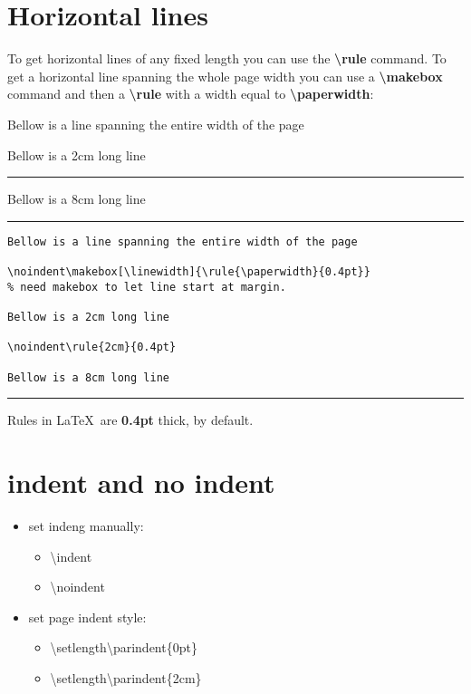 \section{Horizontal lines}
To get horizontal lines of any fixed length you can use the \textbf{\textbackslash rule} command. To get a horizontal line spanning the whole page width you can use a \textbf{\textbackslash makebox} command and then a \textbf{\textbackslash rule} with a width equal to \textbf{\textbackslash paperwidth}:

Bellow is a line spanning the entire width of the page

\noindent\makebox[\linewidth]{\rule{\paperwidth}{0.4pt}} 

Bellow is a 2cm long line

\noindent\rule{2cm}{0.4pt}

Bellow is a 8cm long line

\noindent\rule{8cm}{0.4pt}

\begin{lstlisting}[language={[LaTeX]TeX}]
Bellow is a line spanning the entire width of the page

\noindent\makebox[\linewidth]{\rule{\paperwidth}{0.4pt}}
% need makebox to let line start at margin.

Bellow is a 2cm long line

\noindent\rule{2cm}{0.4pt}

Bellow is a 8cm long line
\end{lstlisting}
\noindent\hrule\vspace{1em}

Rules in \LaTeX~are \textbf{0.4pt} thick, by default.

\section{indent and no indent}
\begin{itemize}
	\item set indeng manually:
	\begin{itemize}
		\item \textbackslash indent
		\item \textbackslash noindent
	\end{itemize}
	\item set page indent style:
	\begin{itemize}
		\item \textbackslash setlength{\textbackslash parindent\{0pt\}}
		\item \textbackslash setlength{\textbackslash parindent\{2cm\}}
	\end{itemize}
\end{itemize}

